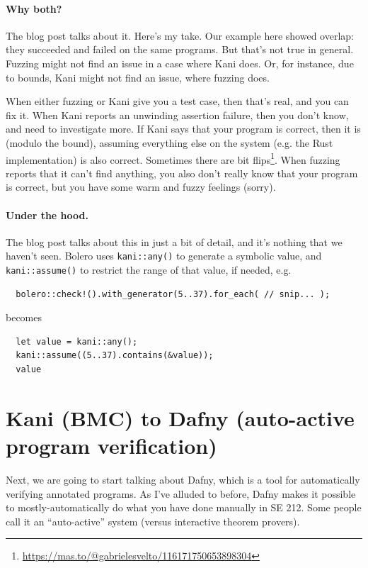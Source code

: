 \documentclass[11pt]{article}
\begin{document}
\paragraph{Why both?} The blog post talks about it. Here's my take.
Our example here showed overlap: they succeeded and failed on the same
programs. But that's not true in general. Fuzzing might not find an issue
in a case where Kani does. Or, for instance, due to bounds, Kani might
not find an issue, where fuzzing does.

When either fuzzing or Kani give you a test case, then that's real,
and you can fix it. When Kani reports an unwinding assertion failure, then you don't know,
and need to investigate more.
If Kani says that your program is correct, then it is (modulo the bound),
assuming everything else on the system (e.g. the Rust implementation)
is also correct. Sometimes there are bit flips\footnote{\url{https://mas.to/@gabrielesvelto/116171750653898304}}.
When fuzzing reports that it can't find anything, you also don't really know
that your program is correct, but you have some warm and fuzzy feelings (sorry).

\paragraph{Under the hood.} The blog post talks about this in
just a bit of detail, and it's nothing that we haven't seen.
Bolero uses \texttt{kani::any()} to generate a symbolic value, and
\texttt{kani::assume()} to restrict the range of that value, if needed,
e.g.
\begin{lstlisting}
  bolero::check!().with_generator(5..37).for_each( // snip... );
\end{lstlisting}
becomes
\begin{lstlisting}
  let value = kani::any();
  kani::assume((5..37).contains(&value));
  value
\end{lstlisting}

\section*{Kani (BMC) to Dafny (auto-active program verification)}
Next, we are going to start talking about Dafny, which is a tool for
automatically verifying annotated programs. As I've alluded to
before, Dafny makes it possible to mostly-automatically do what you have
done manually in SE 212. Some people call it an ``auto-active'' system
(versus interactive theorem provers).
\end{document}
